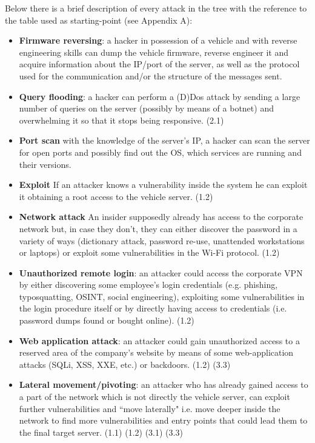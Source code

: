 \noindent Below there is a brief description of every attack in the tree with the reference to the table used as starting-point (see Appendix A):

\begin{itemize}
	\item \textbf{Firmware reversing}: a hacker in possession of a vehicle and with reverse engineering skills can dump the vehicle firmware, reverse engineer it and acquire information about the IP/port of the server, as well as the protocol used for the communication and/or the structure of the messages sent.
	
	\item \textbf{Query flooding}: a hacker can perform a (D)Dos attack by sending a large number of queries on the server (possibly by means of a botnet) and overwhelming it so that it stops being responsive. (2.1)
	
	\item \textbf{Port scan} with the knowledge of the server's IP, a hacker can scan the server for open ports and possibly find out the OS, which services are running and their versions. 
	
	\item \textbf{Exploit} If an attacker knows a vulnerability inside the system he can exploit it obtaining a root access to the vehicle server. (1.2) 
	
	\item \textbf{Network attack} An insider supposedly already has access to the corporate network but, in case they don't, they can either discover the password in a variety of ways (dictionary attack, password re-use, unattended workstations or laptops) or exploit some vulnerabilities in the Wi-Fi protocol. (1.2)
	
	\item \textbf{Unauthorized remote login}: an attacker could access the corporate VPN by either discovering some employee's login credentials (e.g. phishing, typosquatting, OSINT, social engineering), exploiting some vulnerabilities  in the login procedure itself or by directly having access to credentials (i.e. password dumps found or bought online). (1.2)
	
	\item \textbf{Web application attack}: an attacker could gain unauthorized access to a reserved area of the company's website by means of some web-application attacks (SQLi, XSS, XXE, etc.) or backdoors. (1.2) (3.3)
	
	\item \textbf{Lateral movement/pivoting}: an attacker who has already gained access to a part of the network which is not directly the vehicle server, can exploit further vulnerabilities and ``move laterally" i.e. move deeper inside the network to find more vulnerabilities and entry points that could lead them to the final target server. (1.1) (1.2) (3.1) (3.3)
	

\end{itemize}
